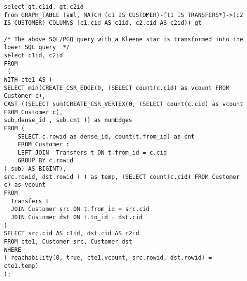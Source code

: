 \begin{lstlisting}[caption=SQL/PGQ query transformed into SQL query with Kleene star, label=app:sqlpgqquerykleene] 
select gt.c1id, gt.c2id
from GRAPH_TABLE (aml, MATCH (c1 IS CUSTOMER)-[t1 IS TRANSFERS*]->(c2 IS CUSTOMER) COLUMNS (c1.cid AS c1id, c2.cid AS c2id)) gt

/* The above SQL/PGQ query with a Kleene star is transformed into the lower SQL query  */
select c1id, c2id 
FROM
 (
WITH cte1 AS (
SELECT min(CREATE_CSR_EDGE(0, (SELECT count(c.cid) as vcount FROM Customer c), 
CAST ((SELECT sum(CREATE_CSR_VERTEX(0, (SELECT count(c.cid) as vcount FROM Customer c), 
sub.dense_id , sub.cnt )) as numEdges 
FROM (
    SELECT c.rowid as dense_id, count(t.from_id) as cnt
    FROM Customer c  
    LEFT JOIN  Transfers t ON t.from_id = c.cid
    GROUP BY c.rowid
) sub) AS BIGINT), 
src.rowid, dst.rowid ) ) as temp, (SELECT count(c.cid) FROM Customer c) as vcount
FROM 
  Transfers t 
  JOIN Customer src ON t.from_id = src.cid
  JOIN Customer dst ON t.to_id = dst.cid
)
SELECT src.cid AS c1id, dst.cid AS c2id
FROM cte1, Customer src, Customer dst 
WHERE  
( reachability(0, true, cte1.vcount, src.rowid, dst.rowid) = cte1.temp)
);
\end{lstlisting}
